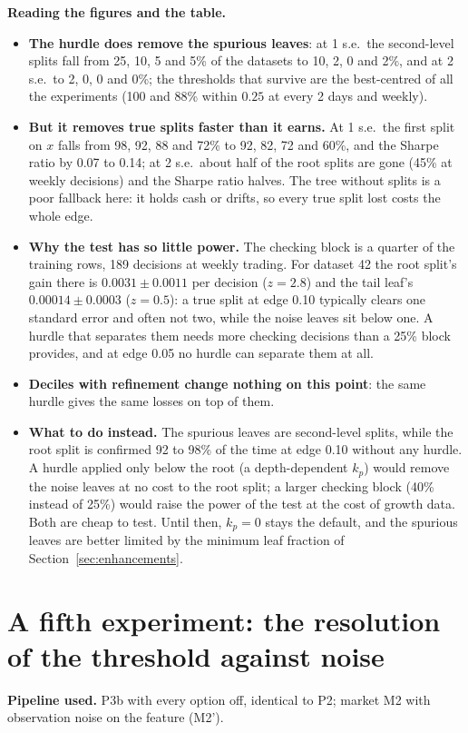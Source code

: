 \documentclass[11pt,a4paper]{article}
\newcommand{\1}{\mathbf{1}}
\begin{document}
\textbf{Reading the figures and the table.}
\begin{itemize}\setlength{\itemsep}{1pt}
\item \textbf{The hurdle does remove the spurious leaves}: at 1 s.e.\ the second-level splits fall from 25, 10, 5 and 5\% of the datasets to 10, 2, 0 and 2\%, and at 2 s.e.\ to 2, 0, 0 and 0\%; the thresholds that survive are the best-centred of all the experiments (100 and 88\% within $0.25$ at every 2 days and weekly).
\item \textbf{But it removes true splits faster than it earns.} At 1 s.e.\ the first split on $x$ falls from 98, 92, 88 and 72\% to 92, 82, 72 and 60\%, and the Sharpe ratio by 0.07 to 0.14; at 2 s.e.\ about half of the root splits are gone (45\% at weekly decisions) and the Sharpe ratio halves. The tree without splits is a poor fallback here: it holds cash or drifts, so every true split lost costs the whole edge.
\item \textbf{Why the test has so little power.} The checking block is a quarter of the training rows, 189 decisions at weekly trading. For dataset 42 the root split's gain there is $0.0031\pm0.0011$ per decision ($z=2.8$) and the tail leaf's $0.00014\pm0.0003$ ($z=0.5$): a true split at edge 0.10 typically clears one standard error and often not two, while the noise leaves sit below one. A hurdle that separates them needs more checking decisions than a 25\% block provides, and at edge 0.05 no hurdle can separate them at all.
\item \textbf{Deciles with refinement change nothing on this point}: the same hurdle gives the same losses on top of them.
\item \textbf{What to do instead.} The spurious leaves are second-level splits, while the root split is confirmed 92 to 98\% of the time at edge 0.10 without any hurdle. A hurdle applied only below the root (a depth-dependent $k_p$) would remove the noise leaves at no cost to the root split; a larger checking block (40\% instead of 25\%) would raise the power of the test at the cost of growth data. Both are cheap to test. Until then, $k_p=0$ stays the default, and the spurious leaves are better limited by the minimum leaf fraction of Section~\ref{sec:enhancements}.
\end{itemize}


\section{A fifth experiment: the resolution of the threshold against noise}\label{sec:resolution}
\textbf{Pipeline used.} P3b with every option off, identical to P2; market M2 with observation noise on the feature (M2').
\end{document}
